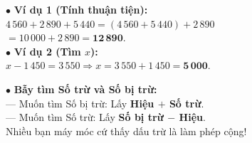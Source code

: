 \documentclass[14pt,a4paper,oneside]{extbook}
\begin{document}
\noindent
\begin{minipage}[t]{0.53\textwidth}
  \begin{tcolorbox}[
    enhanced,
    title={\footnotesize\bfseries\color{white}\faCheckCircle\ Ví dụ thực hành chuẩn mực},
    colback=green!2!white,
    colframe=green!60!black,
    arc=2.5mm, boxrule=0.8pt, top=1.8mm, bottom=1.8mm, left=2.2mm, right=2.2mm
  ]
    \footnotesize
    $\bullet$ \textbf{Ví dụ 1 (Tính thuận tiện):}\\
    $4\,560 + 2\,890 + 5\,440 = (4\,560 + 5\,440) + 2\,890$\\
    $= 10\,000 + 2\,890 = \mathbf{12\,890}$.\\[1mm]
    $\bullet$ \textbf{Ví dụ 2 (Tìm $x$):}\\
    $x - 1\,450 = 3\,550 \Rightarrow x = 3\,550 + 1\,450 = \mathbf{5\,000}$.
  \end{tcolorbox}
\end{minipage}%
\hfill
\begin{minipage}[t]{0.45\textwidth}
  \begin{tcolorbox}[
    enhanced,
    title={\footnotesize\bfseries\color{white}\faExclamationTriangle\ Mẹo tránh bẫy trắc nghiệm},
    colback=red!2!white,
    colframe=red!70!black,
    arc=2.5mm, boxrule=0.8pt, top=1.8mm, bottom=1.8mm, left=2.2mm, right=2.2mm
  ]
    \footnotesize
    $\bullet$ \textbf{Bẫy tìm Số trừ và Số bị trừ:}\\
    --- Muốn tìm Số bị trừ: Lấy \textbf{Hiệu $+$ Số trừ}.\\
    --- Muốn tìm Số trừ: Lấy \textbf{Số bị trừ $-$ Hiệu}.\\
    Nhiều bạn máy móc cứ thấy dấu trừ là làm phép cộng!
  \end{tcolorbox}
\end{minipage}
\end{document}
